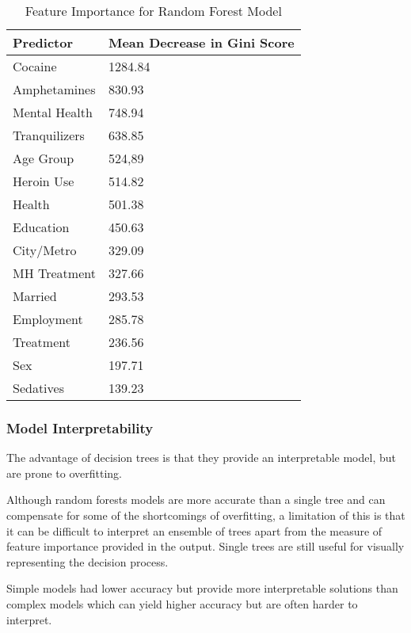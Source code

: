 \documentclass[sigconf]{acmart}
\begin{document}

\begin{table}
  \caption{Feature Importance for Random Forest Model}
  \label{tab:freq}
  \begin{tabular}{ll}
    \toprule
    Predictor&  Mean Decrease in Gini Score  \\    
    \midrule
    Cocaine       & 1284.84 \\
    Amphetamines  &  830.93 \\
    Mental Health &  748.94 \\ 
    Tranquilizers &  638.85 \\
    Age Group     &  524,89 \\
    Heroin Use    &  514.82 \\
    Health        &  501.38 \\
    Education     &  450.63 \\
    City/Metro    &  329.09 \\
    MH Treatment  &  327.66 \\
    Married       &  293.53 \\
    Employment    &  285.78 \\ 
    Treatment     &  236.56 \\
    Sex           &  197.71 \\
    Sedatives   &  139.23 \\
    \bottomrule
  \end{tabular}
\end{table}


\subsubsection{Model Interpretability}


The advantage of decision trees is that they provide an interpretable model,
but are prone to overfitting. 

Although random forests models are more accurate than a single tree and can
compensate for some of the shortcomings of overfitting, a limitation of this 
is that it can be difficult to interpret an ensemble of trees apart from the 
measure of feature importance provided in the output. Single trees are still 
useful for visually representing the decision process.

Simple models had lower accuracy but provide more interpretable solutions 
than complex models which can yield higher accuracy but are often harder 
to interpret. 
\end{document}
